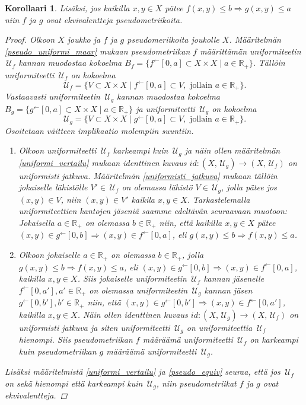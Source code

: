 \documentclass[12pt,a4paper,leqno]{report}
\newcommand{\R}{\mathbb{R}}
\newcommand{\U}{\,\mathcal{U}}
\theoremstyle{plain}
\newtheorem{kor}[equation]{Korollaari}
\theoremstyle{definition}
\theoremstyle{remark}
\begin{document}
\begin{kor}
Lisäksi, jos kaikilla $x,y\in X$ pätee $f(x,y)\leq b \Rightarrow g(x,y)\leq a$ niin $f$ ja $g$ ovat ekvivalentteja pseudometriikoita.
\begin{proof}
Olkoon $X$ joukko ja $f$ ja $g$ pseudomeriikoita joukolle $X$. 
Määritelmän \ref{pseudo_uniformi_maar} mukaan pseudometriikan $f$ määrittämän uniformiteetin $\U_f$ kannan muodostaa kokoelma $B_f=\{ f^{\leftarrow}[0,a]\subset X\times X\mid a\in\R_+\}$. 
Tällöin uniformiteetti $ \U_f$ on kokoelma 
$$\U_f=\{ V\subset X\times X\mid f^{\leftarrow}[0,a]\subset V, \text{ jollain } a\in\R_+\}.$$
Vastaavasti uniformiteetin $\U_g$ kannan muodostaa kokoelma $B_g=\{ g^{\leftarrow}[0,a]\subset X\times X\mid a\in\R_+\}$ ja uniformiteetti $ \U_g$ on kokoelma 
$$\U_g=\{ V\subset X\times X\mid g^{\leftarrow}[0,a]\subset V, \text{ jollain } a\in\R_+\}.$$ 
Osoitetaan väitteen implikaatio molempiin suuntiin.
\begin{enumerate}
\item[$\Rightarrow$] 
Olkoon uniformiteetti $\U_f$ karkeampi kuin $\U_g$ ja näin ollen määritelmän \ref{uniformi_vertailu} mukaan identtinen kuvaus $id\colon(X,\U_g)\rightarrow(X,\U_f)$ on uniformisti jatkuva. 
Määritelmän \ref{uniformisti_jatkuva} mukaan tällöin jokaiselle %
lähistölle $V'\in\U_f $ on olemassa %
lähistö $V\in\U_g $, jolla pätee jos $(x,y)\in V$, niin $(x,y)\in V'$ kaikila $x,y\in X$. Tarkastelemalla uniformiteettien kantojen jäseniä saamme edeltävän seuraavaan muotoon: Jokaisella $a\in\R_+$ on olemassa $b\in\R_+$ niin, että kaikilla $x,y\in X$ pätee $(x,y)\in g^{\leftarrow}[0,b]\Rightarrow (x,y)\in f^{\leftarrow}[0,a]$, eli $g(x,y)\leq b\Rightarrow f(x,y) \leq a$.
\item[$\Leftarrow$] Olkoon jokaiselle 
$a\in\R_+$ on olemassa $b\in\R_+$, jolla $g(x,y)\leq b \Rightarrow f(x,y)\leq a$, eli $(x,y)\in g^{\leftarrow}[0,b]\Rightarrow (x,y)\in f^{\leftarrow}[0,a]$, kaikilla $x,y\in X$. 
Siis jokaiselle uniformiteetin $\U_f$ kannan jäsenelle $f^{\leftarrow}[0,a'],a'\in\R_+ $ on olemassa uniformiteetin $\U_g$ kannan jäsen $g^{\leftarrow}[0,b'],b'\in\R_+$ niin, että $(x,y)\in g^{\leftarrow}[0,b']\Rightarrow (x,y)\in f^{\leftarrow}[0,a']$, kaikilla $x,y\in X$. 
Näin ollen identtinen kuvaus $id\colon (X,\U_g)\rightarrow (X,\U_f)$ on uniformisti jatkuva ja siten uniformiteetti $\U_g$ on uniformiteettia $\U_f$ hienompi. %
Siis pseudometriikan $f$ määräämä uniformiteetti 
$\U_f$ 
on karkeampi kuin pseudometriikan $g$ määräämä uniformiteetti $\U_g$.
\end{enumerate}
Lisäksi 
määritelmistä \ref{uniformi_vertailu} ja \ref{pseudo_equiv} seuraa, että jos $\U_f$ on sekä hienompi että karkeampi kuin $\U_g$, niin pseudometriikat $f$ ja $g$ ovat ekvivalentteja.
\end{proof}
\end{kor}
\end{document}
